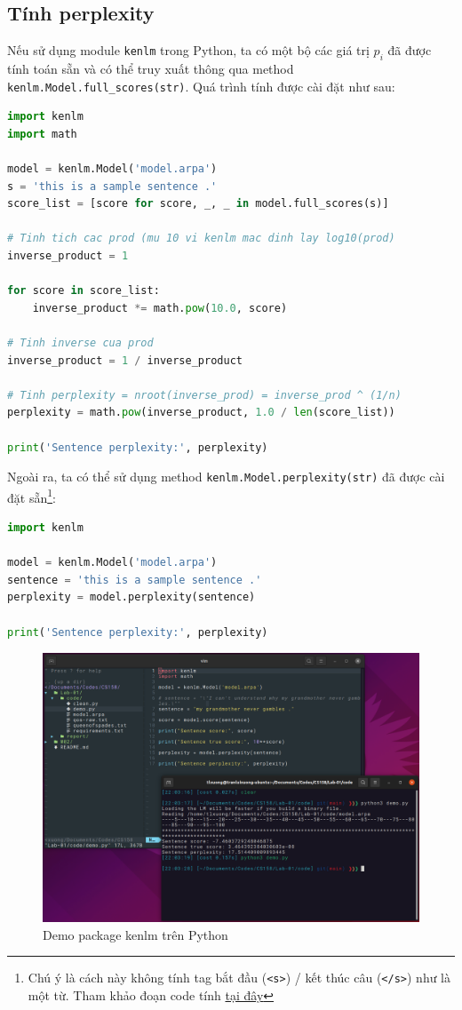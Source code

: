 \documentclass[12pt]{article}
\begin{document}
\subsection{Tính perplexity}
Nếu sử dụng module \texttt{kenlm} trong Python, ta có một bộ các giá trị $p_i$ đã được tính toán sẵn và có thể truy xuất thông qua method \texttt{kenlm.Model.full\_scores(str)}. Quá trình tính được cài đặt như sau:
\begin{lstlisting}[language=python]
import kenlm
import math

model = kenlm.Model('model.arpa')
s = 'this is a sample sentence .'
score_list = [score for score, _, _ in model.full_scores(s)]

# Tinh tich cac prod (mu 10 vi kenlm mac dinh lay log10(prod)
inverse_product = 1

for score in score_list:
    inverse_product *= math.pow(10.0, score)

# Tinh inverse cua prod
inverse_product = 1 / inverse_product

# Tinh perplexity = nroot(inverse_prod) = inverse_prod ^ (1/n)
perplexity = math.pow(inverse_product, 1.0 / len(score_list))

print('Sentence perplexity:', perplexity)
\end{lstlisting}
Ngoài ra, ta có thể sử dụng method \texttt{kenlm.Model.perplexity(str)} đã được cài đặt sẵn\footnote{Chú ý là cách này không tính tag bắt đầu (\texttt{<s>}) / kết thúc câu (\texttt{</s>}) như là một từ. Tham khảo đoạn code tính \href{https://github.com/kpu/kenlm/blob/217e219a34f8ac5d096b2fff3dede82b5a182a88/python/kenlm.pyx\#L209-L215}{tại đây}}:
\begin{lstlisting}[language=python]
import kenlm

model = kenlm.Model('model.arpa')
sentence = 'this is a sample sentence .'
perplexity = model.perplexity(sentence)

print('Sentence perplexity:', perplexity)
\end{lstlisting}

\begin{figure}[h]
    \centering
    \includegraphics[scale=.60]{python-demo.PNG}
    \caption{Demo package kenlm trên Python}
\end{figure}
\end{document}
